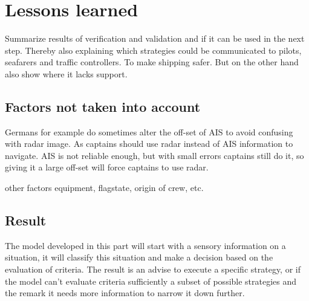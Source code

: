 \chapter{Lessons learned}
Summarize results of verification and validation and if it can be used in the next step. Thereby also explaining which strategies could be communicated to pilots, seafarers and traffic controllers. To make shipping safer. But on the other hand also show where it lacks support.

\section{Factors not taken into account}
Germans for example do sometimes alter the off-set of AIS to avoid confusing with radar image. As captains should use radar instead of AIS information to navigate. AIS is not reliable enough, but with small errors captains still do it, so giving it a large off-set will force captains to use radar.

other factors equipment, flagstate, origin of crew, etc.

\section{Result}
The model developed in this part will start with a sensory information on a situation, it will classify this situation and make a decision based on the evaluation of criteria. The result is an advise to execute a specific strategy, or if the model can't evaluate criteria sufficiently a subset of possible strategies and the remark it needs more information to narrow it down further.